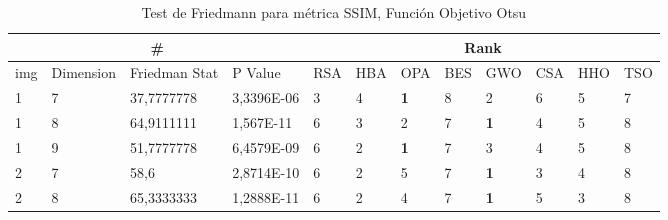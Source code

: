 \documentclass[conference]{IEEEtran}
\begin{document}

\begin{table}[]
	\centering
	\caption{Test de Friedmann para métrica SSIM, Función Objetivo Otsu}
	\begin{tabular}{|llll|llllllll|}
		\hline
		\multicolumn{4}{|c|}{\#} & \multicolumn{8}{c|}{Rank} \\ \hline
		\multicolumn{1}{|l|}{img} & \multicolumn{1}{l|}{Dimension} & \multicolumn{1}{l|}{Friedman Stat} & P Value    & \multicolumn{1}{l|}{RSA} & \multicolumn{1}{l|}{HBA}        & \multicolumn{1}{l|}{OPA}        & \multicolumn{1}{l|}{BES}        & \multicolumn{1}{l|}{GWO}        & \multicolumn{1}{l|}{CSA}        & \multicolumn{1}{l|}{HHO} & TSO                    \\ \hline
		\multicolumn{1}{|l|}{1}   & \multicolumn{1}{l|}{7}         & \multicolumn{1}{l|}{37,7777778}    & 3,3396E-06 & \multicolumn{1}{l|}{3}   & \multicolumn{1}{l|}{4}          & \multicolumn{1}{l|}{\textbf{1}} & \multicolumn{1}{l|}{8}          & \multicolumn{1}{l|}{2}          & \multicolumn{1}{l|}{6}          & \multicolumn{1}{l|}{5}   & 7                      \\ \hline
		\multicolumn{1}{|l|}{1}   & \multicolumn{1}{l|}{8}         & \multicolumn{1}{l|}{64,9111111}    & 1,567E-11  & \multicolumn{1}{l|}{6}   & \multicolumn{1}{l|}{3}          & \multicolumn{1}{l|}{2}          & \multicolumn{1}{l|}{7}          & \multicolumn{1}{l|}{\textbf{1}} & \multicolumn{1}{l|}{4}          & \multicolumn{1}{l|}{5}   & 8                      \\ \hline
		\multicolumn{1}{|l|}{1}   & \multicolumn{1}{l|}{9}         & \multicolumn{1}{l|}{51,7777778}    & 6,4579E-09 & \multicolumn{1}{l|}{6}   & \multicolumn{1}{l|}{2}          & \multicolumn{1}{l|}{\textbf{1}} & \multicolumn{1}{l|}{7}          & \multicolumn{1}{l|}{3}          & \multicolumn{1}{l|}{4}          & \multicolumn{1}{l|}{5}   & 8                      \\ \hline
		\multicolumn{1}{|l|}{2}   & \multicolumn{1}{l|}{7}         & \multicolumn{1}{l|}{58,6}          & 2,8714E-10 & \multicolumn{1}{l|}{6}   & \multicolumn{1}{l|}{2}          & \multicolumn{1}{l|}{5}          & \multicolumn{1}{l|}{7}          & \multicolumn{1}{l|}{\textbf{1}} & \multicolumn{1}{l|}{3}          & \multicolumn{1}{l|}{4}   & 8                      \\ \hline
		\multicolumn{1}{|l|}{2}   & \multicolumn{1}{l|}{8}         & \multicolumn{1}{l|}{65,3333333}    & 1,2888E-11 & \multicolumn{1}{l|}{6}   & \multicolumn{1}{l|}{2}          & \multicolumn{1}{l|}{4}          & \multicolumn{1}{l|}{7}          & \multicolumn{1}{l|}{\textbf{1}} & \multicolumn{1}{l|}{5}          & \multicolumn{1}{l|}{3}   & 8                      \\ \hline

\end{tabular}
\end{table}
\end{document}
